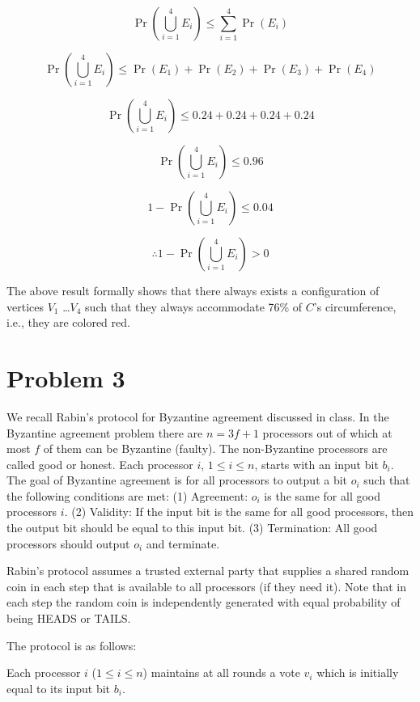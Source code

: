 \documentclass[11pt]{article}
\begin{document}
\begin{enumerate}
        \[
            \Pr(\bigcup_{i = 1}^{4} E_i) \leq \sum_{i = 1}^{4} \Pr(E_i)
        \]

        \[
            \Pr(\bigcup_{i = 1}^{4} E_i) \leq \Pr(E_1) + \Pr(E_2) + \Pr(E_3) + \Pr(E_4)
        \]

        \[
            \Pr(\bigcup_{i = 1}^{4} E_i) \leq 0.24 + 0.24 + 0.24 + 0.24
        \]

        \[
            \Pr(\bigcup_{i = 1}^{4} E_i) \leq 0.96
        \]

        \[
            1 - \Pr(\bigcup_{i = 1}^{4} E_i) \leq 0.04
        \]

        \[
            \boxed{\therefore 1 - \Pr(\bigcup_{i = 1}^{4} E_i) > 0}
        \]

    The above result formally shows that there always exists a configuration of vertices \(V_1\) \dots \(V_4\) such that they always accommodate 76\% of \(C\)'s circumference, i.e., they are colored red.
        
\end{enumerate}

\section*{Problem 3}

We recall Rabin's protocol for Byzantine agreement discussed in class. In the Byzantine agreement problem there are $n = 3f+1$ processors out of which at most $f$ of them can be Byzantine (faulty). The non-Byzantine processors are called good or honest.  Each processor $i$, $1 \leq i \leq n$, starts with an input bit $b_i$. The goal of Byzantine agreement is for all processors to output a bit $o_i$
such that the following conditions are met: (1) Agreement: $o_i$ is the same for all good processors $i$.
(2) Validity: If the input bit is the same for all good processors, then the output bit should be equal to this input bit.
(3) Termination: All good processors should output $o_i$ and terminate.


Rabin's protocol assumes a trusted external party that supplies a shared random coin in each step that is available to all processors (if they need it). Note that in each step the random coin is independently generated with equal probability of being HEADS or TAILS.

The protocol is as follows:


Each processor $i$ ($1\leq i \leq n$) maintains at all rounds a vote $v_i$ which is initially equal to its input bit $b_i$. 
\end{document}
